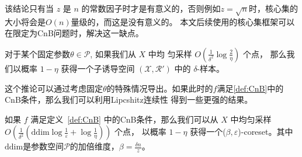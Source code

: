该结论只有当 $z$ 是 $n$ 的常数因子时才是有意义的，否则例如$z=\sqrt n$时，核心集的大小将会是$O(n)$量级的，而这是没有意义的。
本文后续使用的核心集框架可以在限定为CnB问题时，解决这一缺点。
\begin{corollary}
    对于某个固定参数$\theta \in \mathcal{P}$, 如果我们从 $X$ 中均
    匀采样 $O\left(\frac{1}{\delta^2}  \log \frac{2}{\eta}\right)$ 个点，
    那么我们以概率 $1 - \eta$ 获得一个子诱导空间 $(\mathcal{X}, \mathcal{R}')$ 中的 $\delta$-样本。
    \label{cor:fixed theta}
\end{corollary}   

这个推论可以通过考虑固定$\theta$的特殊情况导出。如果此时的$f$满足\ref{def:CnB}中的CnB条件，那么我们可以利用Lipcshitz连续性
得到一些更强的结果。

\begin{theorem}
    如果 $f$ 满足定义~\ref{def:CnB} 中的CnB条件，那么我们可以从 $X$ 中均匀采样 $O\left(\frac{1}{\delta^2} \left(\text{ddim}\log \frac 1 \varepsilon + \log \frac{1}{\eta}\right)\right)$ 个点，
    以概率 $1 - \eta$ 获得一个($\beta, \varepsilon$)-coreset。其中$\text{ddim}$是参数空间$\mathcal{P}$的加倍维度，$\beta = \frac{\delta n}{z}$。
    \label{thm:uniform}
\end{theorem}
